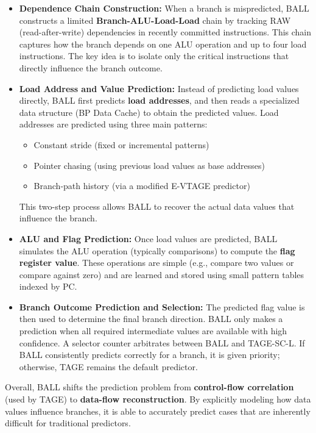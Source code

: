 \documentclass[11pt,a4paper]{article}
\begin{document}
\begin{itemize}
        \item \textbf{Dependence Chain Construction: }  
        When a branch is mispredicted, BALL constructs a limited \textbf{Branch-ALU-Load-Load} chain by tracking RAW (read-after-write) dependencies in recently committed instructions. This chain captures how the branch depends on one ALU operation and up to four load instructions. The key idea 
        is to isolate only the critical instructions that directly influence the branch outcome.
        \item \textbf{Load Address and Value Prediction: }  
        Instead of predicting load values directly, BALL first predicts \textbf{load addresses}, and then reads a specialized data structure (BP Data Cache) to obtain the predicted values.  
        Load addresses are predicted using three main patterns:
        \begin{itemize}
                \item Constant stride (fixed or incremental patterns)
                \item Pointer chasing (using previous load values as base addresses)
                \item Branch-path history (via a modified E-VTAGE predictor)
        \end{itemize}
        This two-step process allows BALL to recover the actual data values that influence the branch.
        \item \textbf{ALU and Flag Prediction: }  
        Once load values are predicted, BALL simulates the ALU operation (typically comparisons) to compute the \textbf{flag register value}. These operations are simple (e.g., compare two values or compare against zero) and are learned and stored using small pattern tables indexed by PC.
        \item \textbf{Branch Outcome Prediction and Selection: }  
        The predicted flag value is then used to determine the final branch direction. BALL only makes a prediction when all required intermediate values are available with high confidence.  
        A selector counter arbitrates between BALL and TAGE-SC-L. If BALL consistently predicts correctly for a branch, it is given priority; otherwise, TAGE remains the default predictor.
\end{itemize}

Overall, BALL shifts the prediction problem from \textbf{control-flow correlation} (used by TAGE) to \textbf{data-flow reconstruction}. By explicitly modeling how data values influence branches, it is able to accurately predict cases that are inherently difficult for traditional predictors.
\end{document}
